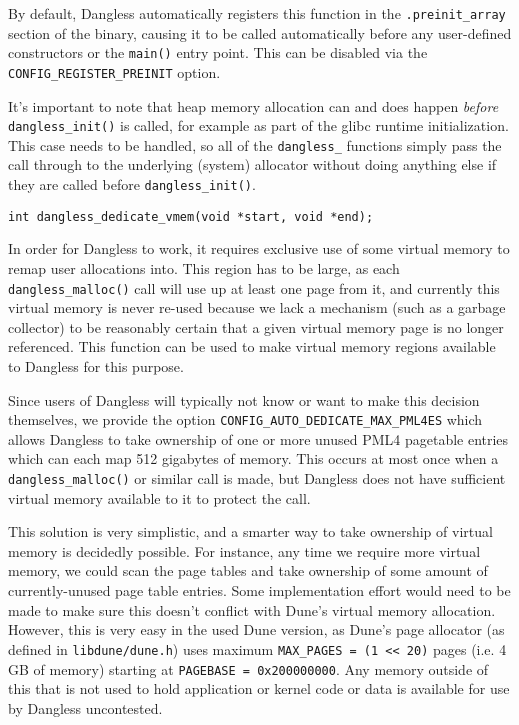 By default, Dangless automatically registers this function in the \lstinline!.preinit_array! section of the binary, causing it to be called automatically before any user-defined constructors or the \lstinline!main()! entry point. This can be disabled via the \lstinline!CONFIG_REGISTER_PREINIT! option.

It's important to note that heap memory allocation can and does happen \emph{before} \lstinline!dangless_init()! is called, for example as part of the glibc runtime initialization. This case needs to be handled, so all of the \lstinline!dangless_! functions simply pass the call through to the underlying (system) allocator without doing anything else if they are called before \lstinline!dangless_init()!.

\begin{lstlisting}
int dangless_dedicate_vmem(void *start, void *end);
\end{lstlisting}

In order for Dangless to work, it requires exclusive use of some virtual memory to remap user allocations into. This region has to be large, as each \lstinline!dangless_malloc()! call will use up at least one page from it, and currently this virtual memory is never re-used because we lack a mechanism (such as a garbage collector) to be reasonably certain that a given virtual memory page is no longer referenced. This function can be used to make virtual memory regions available to Dangless for this purpose.

Since users of Dangless will typically not know or want to make this decision themselves, we provide the option \lstinline!CONFIG_AUTO_DEDICATE_MAX_PML4ES! which allows Dangless to take ownership of one or more unused PML4 pagetable entries which can each map 512 gigabytes of memory. This occurs at most once when a \lstinline!dangless_malloc()! or similar call is made, but Dangless does not have sufficient virtual memory available to it to protect the call.

This solution is very simplistic, and a smarter way to take ownership of virtual memory is decidedly possible. For instance, any time we require more virtual memory, we could scan the page tables and take ownership of some amount of currently-unused page table entries. Some implementation effort would need to be made to make sure this doesn't conflict with Dune's virtual memory allocation. However, this is very easy in the used Dune version, as Dune's page allocator (as defined in \texttt{libdune/dune.h}) uses maximum \lstinline!MAX_PAGES = (1 << 20)! pages (i.e. 4 GB of memory) starting at \lstinline!PAGEBASE = 0x200000000!. Any memory outside of this that is not used to hold application or kernel code or data is available for use by Dangless uncontested.
